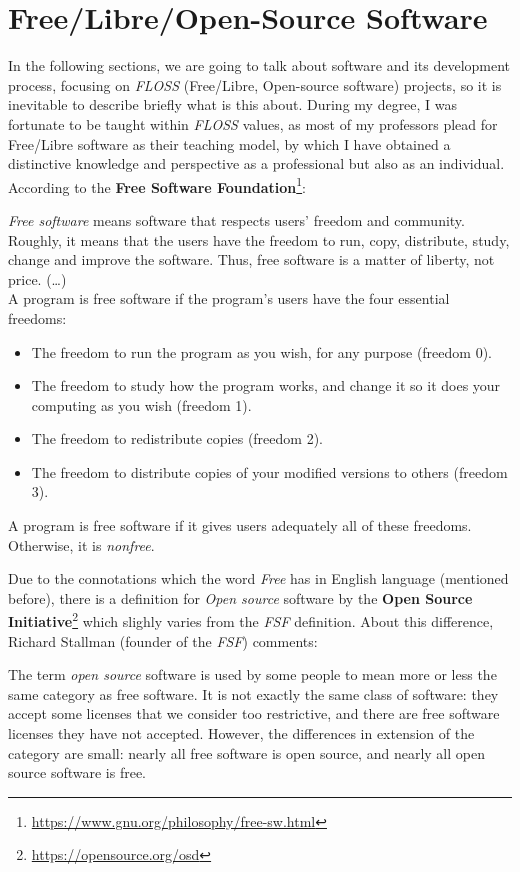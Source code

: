 \documentclass[a4paper, 12pt]{book}
\begin{document}
\section{Free/Libre/Open-Source Software}
\label{sec:floss-definition}
In the following sections, we are going to talk about software and its development process, focusing on \emph{FLOSS} (Free/Libre, Open-source
software) projects, so it is inevitable to describe briefly what is this about.
During my degree, I was fortunate to be taught within \emph{FLOSS} values, as most of my professors plead
for Free/Libre software as their teaching model, by which I have obtained a distinctive knowledge and perspective as a professional but also as an individual.\\
\newpage
According to the \textbf{Free Software Foundation}\footnote{\url{https://www.gnu.org/philosophy/free-sw.html}}:
\begin{displayquote}
    \emph{Free software} means software that respects users' freedom and community. Roughly, it means that the users have the freedom
    to run, copy, distribute, study, change and improve the software. Thus, free software is a matter of liberty, not price. (\ldots)\\
    A program is free software if the program's users have the four essential freedoms:
       \begin{itemize}
           \item The freedom to run the program as you wish, for any purpose (freedom 0).
           \item The freedom to study how the program works, and change it so it does your computing as you wish (freedom 1).
           \item The freedom to redistribute copies (freedom 2).
           \item The freedom to distribute copies of your modified versions to others (freedom 3).
       \end{itemize}
    A program is free software if it gives users adequately all of these freedoms. Otherwise, it is \textit{nonfree}.
\end{displayquote}
Due to the connotations which the word \emph{Free} has in English language (mentioned before), there is a definition
for \emph{Open source} software by the \textbf{Open Source Initiative}\footnote{\url{https://opensource.org/osd}} which
slighly varies from the \emph{FSF} definition. About this difference, Richard Stallman (founder of the \emph{FSF}) comments:
\begin{displayquote}
The term \emph{open source} software is used by some people to mean more or less the same category as free software.
It is not exactly the same class of software: they accept some licenses that we consider too restrictive,
and there are free software licenses they have not accepted. However, the differences in extension of the
category are small: nearly all free software is open source, and nearly all open source software is free.
\end{displayquote}
\end{document}
